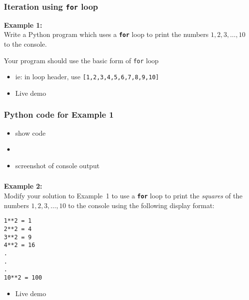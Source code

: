 \documentclass[english,14pt]{beamer}
\newcommand\red[1]{{\color{red} #1}}
\begin{document}
\begin{frame}[fragile]

\frametitle{}

\frametitle{Iteration using \texttt{for} loop}

\textbf{Example 1:}\\
\vspace*{5mm}
Write a Python program which uses a \textbf{\texttt{for}} loop to print the numbers $1, 2, 3, \ldots, 10$ to the console. \\
\vspace*{5mm}

Your program should use the basic form of \texttt{for} loop
\begin{itemize}
	\item ie: in loop header, use \verb+[1,2,3,4,5,6,7,8,9,10]+
\end{itemize}

\vspace*{10mm}

\begin{itemize}
	\item Live demo
\end{itemize}
	
\end{frame}


\begin{frame}[fragile]

\frametitle{Python code for Example 1}

\begin{itemize}
	\item show code
	\item[]
	\item screenshot of console output
\end{itemize}

\end{frame}


\begin{frame}[fragile]

\frametitle{}

\frametitle{}

\textbf{Example 2:}\\
\vspace*{5mm}
Modify your solution to Example~1 to use a \textbf{\texttt{for}} loop to print the \red{\emph{squares}} of the numbers $1, 2, 3, \ldots, 10$ to the console using the following display format:
\begin{verbatim}
1**2 = 1
2**2 = 4
3**2 = 9
4**2 = 16
.
.
.
10**2 = 100
\end{verbatim}

\begin{itemize}
	\item Live demo
\end{itemize}
	
\end{frame}
\end{document}
